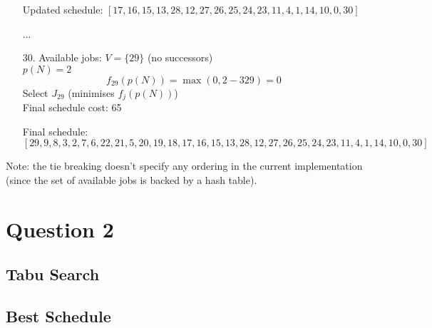\documentclass[fleqn]{article}
\begin{document}
\begin{enumerate}
      Updated schedule: $[17, 16, 15, 13, 28, 12, 27, 26, 25, 24, 23, 11, 4, 1, 14, 10, 0, 30]$

      \item[...]

      \item[30.] Available jobs: $V = \{ 29 \}$ (no successors) \\
      $p(N) = 2$
      \[
      f_{29}(p(N)) = \max(0, 2 - 329) = 0
      \]    
      Select $J_{29}$ (minimises $f_j(p(N))$) \\
      Final schedule cost: 65

      Final schedule: $[29, 9, 8, 3, 2, 7, 6, 22, 21, 5, 20, 19, 18, 17, 16, 15, 13, 28, 12, 27, 26, 25, 24, 23, 11, 4, 1, 14, 10, 0, 30]$
    \end{enumerate}

    Note: the tie breaking doesn't specify any ordering in the current implementation (since the set of available jobs is backed by a hash table).

  \section{Question 2}
  \subsection{Tabu Search}

  \subsection{Best Schedule}
\end{document}
